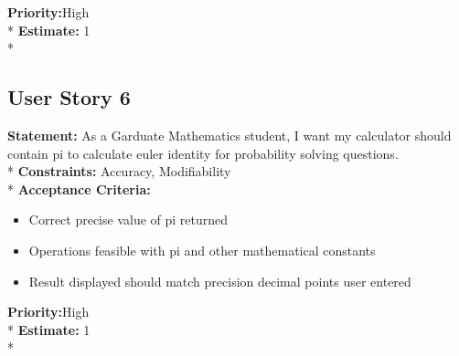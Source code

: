 \documentclass{article}
\begin{document}
\noindent \textbf {Priority:}High\\*
\newline
\noindent \textbf {Estimate:} 1\\*
\newline

\subsection{User Story 6} %

\noindent \textbf {Statement: }As a Garduate Mathematics student, I want my calculator should contain pi to calculate euler identity for probability solving questions. \\*
\newline 
\noindent \textbf {Constraints:}  Accuracy, Modifiability\\*
\newline
\textbf{Acceptance Criteria: } 
\begin{itemize}
  \item Correct precise value of pi returned 
  \item Operations feasible with pi and other mathematical constants
  \item Result displayed should match precision decimal points user entered
\end{itemize}

\noindent \textbf {Priority:}High\\*
\newline
\noindent \textbf {Estimate:} 1\\*
\newline
\end{document}
